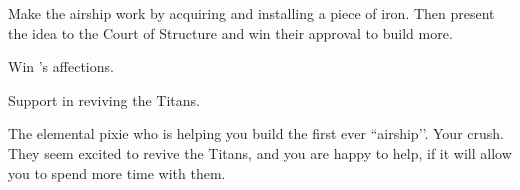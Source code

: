 \documentclass[char]{PP}
\begin{document}
\begin{itemz}
	\item Make the airship work by acquiring and installing a piece of iron. Then present the idea to the Court of Structure and win their approval to build more.
	\item Win \cETitan{}'s affections.
	\item Support \cETitan{} in reviving the Titans.
\end{itemz}

\begin{itemz}[Notes]
	\item 
\end{itemz}

\begin{contacts}
	\contact{\cEAirship{}} The elemental pixie who is helping you build the first ever ``airship’’.
	\contact{\cETitan{}} Your crush.  They seem excited to revive the Titans, and you are happy to help, if it will allow you to spend more time with them.
\end{contacts}
\end{document}
